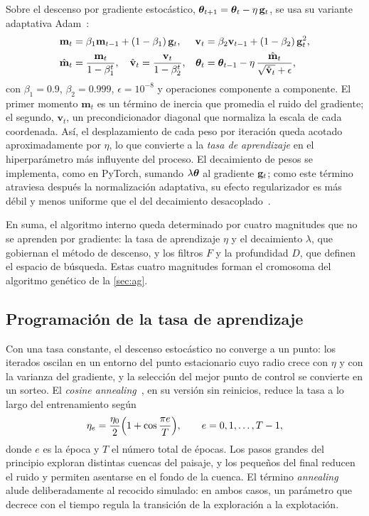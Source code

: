 Sobre el descenso por gradiente estocástico, $\bm{\theta}_{t+1}=\bm{\theta}_t-\eta\,\mathbf{g}_t$, se usa su variante adaptativa Adam~\cite{kingma2015adam}:
\begin{equation}\label{eq:adam}
  \begin{aligned}
    \mathbf{m}_t &= \beta_1\mathbf{m}_{t-1} + (1-\beta_1)\,\mathbf{g}_t, &
    \mathbf{v}_t &= \beta_2\mathbf{v}_{t-1} + (1-\beta_2)\,\mathbf{g}_t^{2},\\
    \hat{\mathbf{m}}_t &= \frac{\mathbf{m}_t}{1-\beta_1^{t}}, \quad
    \hat{\mathbf{v}}_t = \frac{\mathbf{v}_t}{1-\beta_2^{t}}, &
    \bm{\theta}_t &= \bm{\theta}_{t-1} - \eta\,\frac{\hat{\mathbf{m}}_t}{\sqrt{\hat{\mathbf{v}}_t}+\epsilon},
  \end{aligned}
\end{equation}
con $\beta_1=0.9$, $\beta_2=0.999$, $\epsilon=10^{-8}$ y operaciones componente a componente. El primer momento $\mathbf{m}_t$ es un término de inercia que promedia el ruido del gradiente; el segundo, $\mathbf{v}_t$, un precondicionador diagonal que normaliza la escala de cada coordenada. Así, el desplazamiento de cada peso por iteración queda acotado aproximadamente por $\eta$, lo que convierte a la \emph{tasa de aprendizaje} en el hiperparámetro más influyente del proceso. El decaimiento de pesos se implementa, como en PyTorch, sumando $\lambda\bm{\theta}$ al gradiente $\mathbf{g}_t$; como este término atraviesa después la normalización adaptativa, su efecto regularizador es más débil y menos uniforme que el del decaimiento desacoplado~\cite{loshchilov2019adamw}.

En suma, el algoritmo interno queda determinado por cuatro magnitudes que no se aprenden por gradiente: la tasa de aprendizaje $\eta$ y el decaimiento $\lambda$, que gobiernan el método de descenso, y los filtros $F$ y la profundidad $D$, que definen el espacio de búsqueda. Estas cuatro magnitudes forman el cromosoma del algoritmo genético de la \cref{sec:ag}.

\subsection{Programación de la tasa de aprendizaje}\label{subsec:programacion}

Con una tasa constante, el descenso estocástico no converge a un punto: los iterados oscilan en un entorno del punto estacionario cuyo radio crece con $\eta$ y con la varianza del gradiente, y la selección del mejor punto de control se convierte en un sorteo. El \textit{cosine annealing}~\cite{loshchilov2017sgdr}, en su versión sin reinicios, reduce la tasa a lo largo del entrenamiento según
\begin{equation}\label{eq:coseno}
  \eta_e = \frac{\eta_0}{2}\Bigl(1+\cos\frac{\pi e}{T}\Bigr), \qquad e = 0,1,\dots,T-1,
\end{equation}
donde $e$ es la época y $T$ el número total de épocas. Los pasos grandes del principio exploran distintas cuencas del paisaje, y los pequeños del final reducen el ruido y permiten asentarse en el fondo de la cuenca. El término \textit{annealing} alude deliberadamente al recocido simulado: en ambos casos, un parámetro que decrece con el tiempo regula la transición de la exploración a la explotación.

